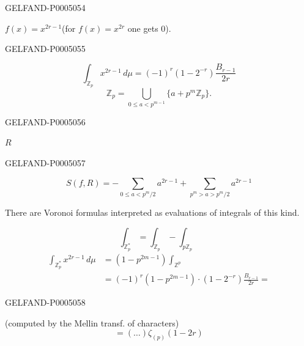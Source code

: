 \begin{GelfandAdjacentEvidence}{GELFAND-P000505}{4}


$f(x)=x^{2r-1}$\qquad (for $f(x)=x^{2r}$ one gets 0).
\end{GelfandAdjacentEvidence}
\begin{GelfandAdjacentEvidence}{GELFAND-P000505}{5}


\[
\int_{\mathbb Z_p}x^{2r-1}\,d\mu=(-1)^r(1-2^{-r})\frac{B_{r-1}}{2r}
\]
\[
\mathbb Z_p=\bigcup_{0\le a<p^{m-1}}\{a+p^m\mathbb Z_p\}.
\]
\end{GelfandAdjacentEvidence}
\begin{GelfandAdjacentEvidence}{GELFAND-P000505}{6}


$R$
\end{GelfandAdjacentEvidence}
\begin{GelfandAdjacentEvidence}{GELFAND-P000505}{7}

\[
S(f,R)=-\sum_{0\le a<p^m/2}a^{2r-1}
+\sum_{p^m>a>p^m/2}a^{2r-1}
\]

There are Voronoi formulas interpreted as evaluations of integrals of this kind.

\[
\int_{\mathbb Z_p^*}=\int_{\mathbb Z_p}-\int_{p\mathbb Z_p}
\]
\[
\begin{aligned}
\int_{\mathbb Z_p^*}x^{2r-1}\,d\mu
&=(1-p^{2m-1})\int_{\mathbb Z^p}\\
&=(-1)^r(1-p^{2m-1})\cdot(1-2^{-r})\frac{B_{r-1}}{2r}=
\end{aligned}
\]
\end{GelfandAdjacentEvidence}
\begin{GelfandAdjacentEvidence}{GELFAND-P000505}{8}

\end{GelfandAdjacentEvidence}


(computed by the Mellin transf. of characters)
\[
=(\ldots)\zeta_{(p)}(1-2r)
\]


